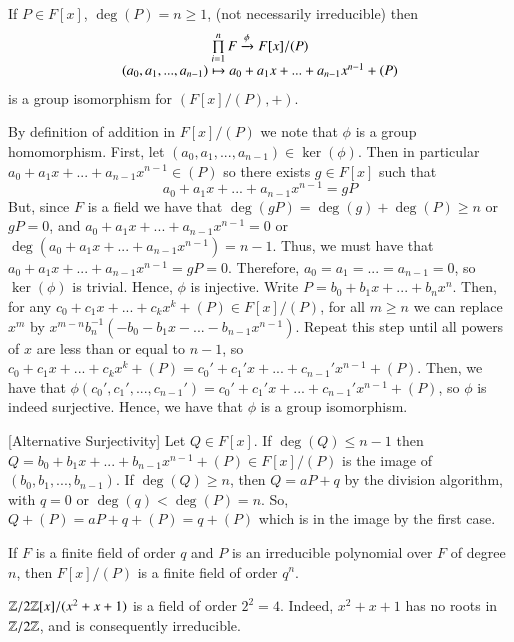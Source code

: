 \documentclass[12pt, a4paper, twoside, openright, titlepage]{book}
\begin{document}
\begin{rmk}{}{}
    If $P \in F[x]$, $\deg(P) = n\geq 1$, (not necessarily irreducible) then \begin{equation}
        \begin{array}{c} \prod\limits_{i=1}^nF \xrightarrow{\phi} F[x]/(P) \\ (a_0,a_1,...,a_{n-1}) \mapsto a_0+a_1x+...+a_{n-1}x^{n-1}+(P) \end{array}
    \end{equation}
    is a group isomorphism for $(F[x]/(P),+)$.
    \begin{proof*}{}{}
        By definition of addition in $F[x]/(P)$ we note that $\phi$ is a group homomorphism. First, let $(a_0,a_1,...,a_{n-1}) \in \ker(\phi)$. Then in particular $a_0+a_1x+...+a_{n-1}x^{n-1} \in (P)$ so there exists $g \in F[x]$ such that $$a_0+a_1x+...+a_{n-1}x^{n-1} = gP$$ But, since $F$ is a field we have that $\deg(gP) = \deg(g) + \deg(P) \geq n$ or $gP = 0$, and $a_0+a_1x+...+a_{n-1}x^{n-1} = 0$ or $\deg(a_0+a_1x+...+a_{n-1}x^{n-1}) = n-1$. Thus, we must have that $a_0+a_1x+...+a_{n-1}x^{n-1} = gP = 0$. Therefore, $a_0 = a_1 =...= a_{n-1} = 0$, so $\ker(\phi)$ is trivial. Hence, $\phi$ is injective. Write $P = b_0 + b_1x + ... + b_nx^n$. Then, for any $c_0+c_1x+...+c_kx^k + (P) \in F[x]/(P)$, for all $m \geq n$ we can replace $x^m$ by $x^{m-n}b_n^{-1}(-b_0-b_1x-...-b_{n-1}x^{n-1})$. Repeat this step until all powers of $x$ are less than or equal to $n-1$, so $c_0+c_1x+...+c_kx^k + (P) = c_0'+c_1'x+...+c_{n-1}'x^{n-1} + (P)$. Then, we have that $\phi(c_0',c_1',...,c_{n-1}') = c_0'+c_1'x+...+c_{n-1}'x^{n-1} + (P)$, so $\phi$ is indeed surjective. Hence, we have that $\phi$ is a group isomorphism.


        [Alternative Surjectivity] Let $Q \in F[x]$. If $\deg(Q) \leq n-1$ then $Q = b_0+b_1x+...+b_{n-1}x^{n-1} + (P) \in F[x]/(P)$ is the image of $(b_0,b_1,...,b_{n-1})$. If $\deg(Q) \geq n$, then $Q = aP+q$ by the division algorithm, with $q = 0$ or $\deg(q) < \deg(P) = n$. So, $Q+(P) = aP+q+(P) = q+(P)$ which is in the image by the first case.
    \end{proof*}
\end{rmk}


\begin{cor}{}{}
    If $F$ is a finite field of order $q$ and $P$ is an irreducible polynomial over $F$ of degree $n$, then $F[x]/(P)$ is a finite field of order $q^n$.
\end{cor}


\begin{eg}{}{}
    $\mathbb Z/2\mathbb Z[x]/(x^2+x+1)$ is a field of order $2^2 = 4$. Indeed, $x^2+x+1$ has no roots in $\mathbb Z/2\mathbb Z$, and is consequently irreducible.
\end{eg}
\end{document}
